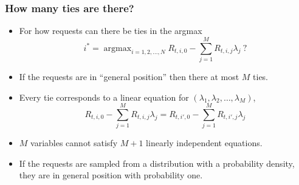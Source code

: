 \documentclass[usenames,dvipsnames]{beamer}
\DeclareMathOperator*{\argmax}{argmax}
\begin{document}
\begin{frame}
\frametitle{How many ties are there?}

\begin{itemize}
\item For how requests can there be ties in the argmax
$$
i^* = \argmax_{i=1,2,\dots,N} R_{t,i,0} - \sum_{j=1}^M R_{t,i,j} \lambda_j \ ?
$$

\item If the requests are in ``general position'' then there at most $M$ ties.

\item Every tie corresponds to a linear equation for $(\lambda_1, \lambda_2, \dots, \lambda_M)$,
$$
R_{t,i,0} - \sum_{j=1}^M R_{t,i,j} \lambda_j = R_{t,i',0} - \sum_{j=1}^M R_{t,i',j} \lambda_j
$$

\item $M$ variables cannot satisfy $M+1$ linearly independent equations.

\item If the requests are sampled from a distribution with a probability density,
they are in general position with probability one.
\end{itemize}

\end{frame}
\end{document}
